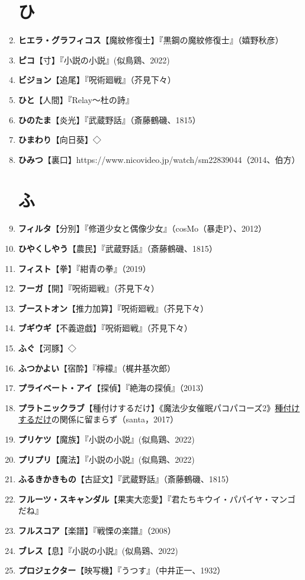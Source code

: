 \documentclass[twocolumn]{jsbook}
\newcommand{\ccite}[1]{《#1》}
\begin{document}
\begin{enumerate}
\section*{ひ}
    \item \textbf{ヒエラ・グラフィコス}【魔紋修復士】『黒鋼の魔紋修復士』（嬉野秋彦）
    \item \textbf{ピコ}【寸】『小説の小説』(似鳥鶏、2022)
    \item \textbf{ビジョン}【追尾】『呪術廻戦』（芥見下々）
    \item \textbf{ひと}【人間】『Relay〜杜の詩』
    \item \textbf{ひのたま}【炎光】『武蔵野話』（斎藤鶴磯、1815）
    \item \textbf{ひまわり}【向日葵】◇
    \item \textbf{ひみつ}【裏口】https://www.nicovideo.jp/watch/sm22839044（2014、伯方）
\section*{ふ}
    \item \textbf{フィルタ}【分別】『修道少女と偶像少女』（cosMo（暴走P）、2012）
    \item \textbf{ひやくしやう}【農民】『武蔵野話』（斎藤鶴磯、1815）
    \item \textbf{フィスト}【拳】『紺青の拳』（2019）
    \item \textbf{フーガ}【開】『呪術廻戦』（芥見下々）
    \item \textbf{ブーストオン}【推力加算】『呪術廻戦』（芥見下々）
    \item \textbf{ブギウギ}【不義遊戯】『呪術廻戦』（芥見下々）
    \item \textbf{ふぐ}【河豚】◇
    \item \textbf{ふつかよい}【宿酔】『檸檬』（梶井基次郎）
    \item \textbf{プライベート・アイ}【探偵】『絶海の探偵』（2013）
    \item \textbf{プラトニックラブ}【種付けするだけ】\ccite{魔法少女催眠パコパコーズ2}{\uline{種付けするだけ}の関係に留まらず}（santa，2017）
    \item \textbf{プリケツ}【魔族】『小説の小説』(似鳥鶏、2022)
    \item \textbf{プリプリ}【魔法】『小説の小説』(似鳥鶏、2022)
    \item \textbf{ふるきかきもの}【古証文】『武蔵野話』（斎藤鶴磯、1815）
    \item \textbf{フルーツ・スキャンダル}【果実大恋愛】『君たちキウイ・パパイヤ・マンゴだね』
    \item \textbf{フルスコア}【楽譜】『戦慄の楽譜』（2008）
    \item \textbf{ブレス}【息】『小説の小説』(似鳥鶏、2022)
    \item \textbf{プロジェクター}【映写機】『うつす』（中井正一、1932）

\end{enumerate}
\end{document}

